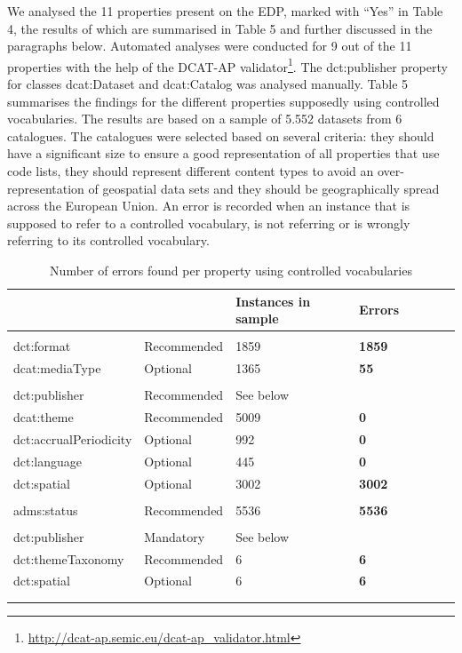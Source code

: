 \documentclass[<options>]{elsarticle}
\begin{document}
We analysed the 11 properties present on the EDP, marked with “Yes” in Table 4, the results of which are summarised in Table 5 and further discussed in the paragraphs below. Automated analyses were conducted for 9 out of the 11 properties with the help of the DCAT-AP validator\footnote{\href{  http://dcat-ap.semic.eu/dcat-ap\_validator.html }{    http://dcat-ap.semic.eu/dcat-ap\_validator.html}}. The dct:publisher property for classes dcat:Dataset and dcat:Catalog was analysed manually. 
Table 5 summarises the findings for the different properties supposedly using controlled vocabularies. The results are based on a sample of 5.552 datasets from 6 catalogues. The catalogues were selected based on several criteria: they should have a significant size to ensure a good representation of all properties that use code lists, they should represent different content types to avoid an over-representation of geospatial data sets and they should be geographically spread across the European Union. An error is recorded when an instance that is supposed to refer to a controlled vocabulary, is not referring or is wrongly referring to its controlled vocabulary.

\begin{longtable}{*8l}
\rowcolor{white!10}{\textbf{Property}} & {} & {\textbf{Instances in sample}} & {\textbf{Errors}} \\ \hline
\rowcolor{gray!10}{Distribution} & {} & {} & {} \\ \hline
\rowcolor{white!10} dct:format &Recommended &1859 &\textbf{1859} \\ \hline
\rowcolor{white!10} dcat:mediaType &Optional &1365 &\textbf{55} \\ \hline
\rowcolor{gray!10}{Dataset} & {} & {} & {} \\ \hline
\rowcolor{white!10} dct:publisher &Recommended &See below \\ \hline
\rowcolor{white!10} dcat:theme &Recommended &5009 &\textbf{0} \\ \hline
\rowcolor{white!10} dct:accrualPeriodicity &Optional &992 &\textbf{0} \\ \hline
\rowcolor{white!10} dct:language &Optional &445 &\textbf{0} \\ \hline
\rowcolor{white!10} dct:spatial &Optional &3002 &\textbf{3002} \\ \hline
\rowcolor{gray!10}{CatalogRecord} & {} & {} & {} \\ \hline
\rowcolor{white!10} adms:status &Recommended &5536 &\textbf{5536} \\ \hline
\rowcolor{gray!10}{Catalog} & {} & {} & {} \\ \hline
\rowcolor{white!10} dct:publisher &Mandatory &See below\\ \hline
\rowcolor{white!10} dct:themeTaxonomy &Recommended &6 &\textbf{6} \\ \hline
\rowcolor{white!10} dct:spatial &Optional &6 &\textbf{6} \\ \hline
\\
\caption{Number of errors found per property using controlled vocabularies }
\end{longtable}
\end{document}

